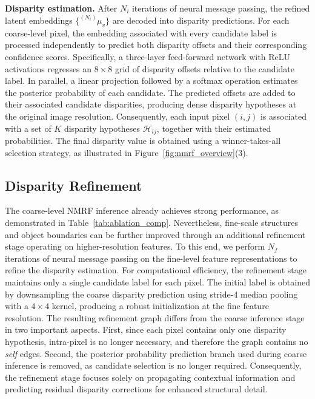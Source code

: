 \noindent\textbf{Disparity estimation.}
After $N_i$ iterations of neural message passing, the refined latent embeddings $\{^{(N_i)}\mu_v\}$ are decoded into disparity predictions.
For each coarse-level pixel, the embedding associated with every candidate label is processed independently to predict both disparity offsets and their corresponding confidence scores.
Specifically, a three-layer feed-forward network with ReLU activations regresses an $8 \times 8$ grid of disparity offsets relative to the candidate label. 
In parallel, a linear projection followed by a softmax operation estimates the posterior probability of each candidate. 
The predicted offsets are added to their associated candidate disparities, producing dense disparity hypotheses at the original image resolution.
Consequently, each input pixel $(i,j)$ is associated with a set of $K$ disparity hypotheses $\mathcal{H}_{ij}$, together with their estimated probabilities. 
The final disparity value is obtained using a winner-takes-all selection strategy, as illustrated in Figure~\ref{fig:nmrf_overview}(3).

\subsection{Disparity Refinement}\label{sec:nmrf_refinement}
The coarse-level NMRF inference already achieves strong performance, as demonstrated in Table~\ref{tab:ablation_comp}.
Nevertheless, fine-scale structures and object boundaries can be further improved through an additional refinement stage operating on higher-resolution features.
To this end, we perform $N_f$ iterations of neural message passing on the fine-level feature representations to refine the disparity estimation.
For computational efficiency, the refinement stage maintains only a single candidate label for each pixel.
The initial label is obtained by downsampling the coarse disparity prediction using stride-4 median pooling with a $4 \times 4$ kernel, producing a robust initialization at the fine feature resolution.
The resulting refinement graph differs from the coarse inference stage in two important aspects.
First, since each pixel contains only one disparity hypothesis, intra-pixel is no longer necessary, and therefore the graph contains no \emph{self} edges.
Second, the posterior probability prediction branch used during coarse inference is removed, as candidate selection is no longer required.
Consequently, the refinement stage focuses solely on propagating contextual information and predicting residual disparity corrections for enhanced structural detail.

